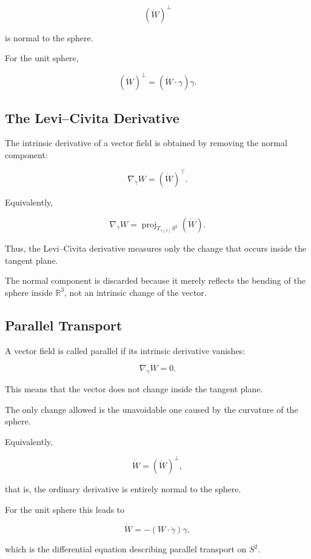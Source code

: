 \documentclass[12pt,a4paper]{article}
\theoremstyle{notespace}
\begin{document}
\[
(\dot W)^{\perp}
\]

is normal to the sphere.

For the unit sphere,

\[
(\dot W)^{\perp}
=
(\dot W\cdot\gamma)\gamma.
\]


\subsection{The Levi--Civita Derivative}

The intrinsic derivative of a vector field is obtained by removing the
normal component:

\[
\boxed{
	\nabla_{\dot\gamma}W
	=
	(\dot W)^{\top}.
}
\]

Equivalently,

\[
\boxed{
	\nabla_{\dot\gamma}W
	=
	\operatorname{proj}_{T_{\gamma(t)}S^2}
	(\dot W).
}
\]

Thus, the Levi--Civita derivative measures only the change that occurs
inside the tangent plane.

The normal component is discarded because it merely reflects the bending
of the sphere inside \(\mathbb R^3\), not an intrinsic change of the
vector.


\subsection{Parallel Transport}

A vector field is called parallel if its intrinsic derivative vanishes:

\[
\boxed{
	\nabla_{\dot\gamma}W=0.
}
\]

This means that the vector does not change inside the tangent plane.

The only change allowed is the unavoidable one caused by the curvature
of the sphere.

Equivalently,

\[
\boxed{
	\dot W
	=
	(\dot W)^{\perp},
}
\]

that is, the ordinary derivative is entirely normal to the sphere.

For the unit sphere this leads to

\[
\boxed{
	\dot W
	=
	-(W\cdot\dot\gamma)\gamma,
}
\]

which is the differential equation describing parallel transport on
\(S^2\).
\end{document}
